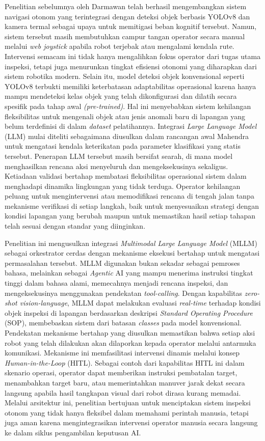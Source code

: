 Penelitian sebelumnya oleh Darmawan \cite{Darmawan2025} telah berhasil mengembangkan sistem navigasi otonom yang terintegrasi dengan deteksi objek berbasis YOLOv8 dan kamera termal sebagai upaya untuk memitigasi beban kognitif tersebut. Namun, sistem tersebut masih membutuhkan campur tangan operator secara manual melalui \textit{web joystick} apabila robot terjebak atau mengalami kendala rute. Intervensi semacam ini tidak hanya mengalihkan fokus operator dari tugas utama inspeksi, tetapi juga menurunkan tingkat efisiensi otonomi yang diharapkan dari sistem robotika modern. Selain itu, model deteksi objek konvensional seperti YOLOv8 terbukti memiliki keterbatasan adaptabilitas operasional karena hanya mampu mendeteksi kelas objek yang telah dikonfigurasi dan dilatih secara spesifik pada tahap awal \textit{(pre-trained)}. Hal ini menyebabkan sistem kehilangan fleksibilitas untuk mengenali objek atau jenis anomali baru di lapangan yang belum terdefinisi di dalam \textit{dataset} pelatihannya. Integrasi \textit{Large Language Model} (LLM) mulai diteliti sebagaimana diusulkan dalam rancangan awal Mahendra \cite{Mahendra2024} untuk mengatasi kendala keterikatan pada parameter klasifikasi yang statis tersebut. Penerapan LLM tersebut masih bersifat searah, di mana model menghasilkan rencana aksi menyeluruh dan mengeksekusinya sekaligus. Ketiadaan validasi bertahap membatasi fleksibilitas operasional sistem dalam menghadapi dinamika lingkungan yang tidak terduga. Operator kehilangan peluang untuk mengintervensi atau memodifikasi rencana di tengah jalan tanpa mekanisme verifikasi di setiap langkah, baik untuk menyesuaikan strategi dengan kondisi lapangan yang berubah maupun untuk memastikan hasil setiap tahapan telah sesuai dengan standar yang diinginkan.

Penelitian ini mengusulkan integrasi \textit{Multimodal Large Language Model} (MLLM) sebagai orkestrator cerdas dengan mekanisme eksekusi bertahap untuk mengatasi permasalahan tersebut. MLLM digunakan bukan sekadar sebagai pemroses bahasa, melainkan sebagai \textit{Agentic} AI yang mampu menerima instruksi tingkat tinggi dalam bahasa alami, memecahnya menjadi rencana inspeksi, dan mengeksekusinya menggunakan pendekatan \textit{tool-calling}. Dengan kapabilitas \textit{zero-shot vision-language}, MLLM dapat melakukan evaluasi \textit{real-time} terhadap kondisi objek inspeksi di lapangan berdasarkan deskripsi \textit{Standard Operating Procedure} (SOP), membebaskan sistem dari batasan \textit{classes} pada model konvensional. Pendekatan mekanisme bertahap yang diusulkan memastikan bahwa setiap aksi robot yang telah dilakukan akan dilaporkan kepada operator melalui antarmuka komunikasi. Mekanisme ini memfasilitasi intervensi dinamis melalui konsep \textit{Human-in-the-Loop} (HITL). Sebagai contoh dari kapabilitas HITL ini dalam skenario operasi, operator dapat memberikan instruksi pembatalan target, menambahkan target baru, atau memerintahkan manuver jarak dekat secara langsung apabila hasil tangkapan visual dari robot dirasa kurang memadai. Melalui arsitektur ini, penelitian bertujuan untuk menciptakan sistem inspeksi otonom yang tidak hanya fleksibel dalam memahami perintah manusia, tetapi juga aman karena mengintegrasikan intervensi operator manusia secara langsung ke dalam siklus pengambilan keputusan AI.

